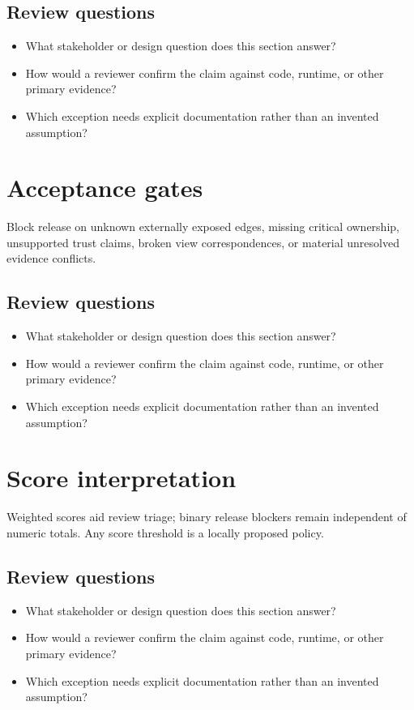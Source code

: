 \documentclass[10pt,letterpaper]{article}
\begin{document}
\subsection{Review questions}
\begin{itemize}
\item What stakeholder or design question does this section answer?
\item How would a reviewer confirm the claim against code, runtime, or other primary evidence?
\item Which exception needs explicit documentation rather than an invented assumption?
\end{itemize}

\section{Acceptance gates}
Block release on unknown externally exposed edges, missing critical ownership, unsupported trust claims, broken view correspondences, or material unresolved evidence conflicts.


\subsection{Review questions}
\begin{itemize}
\item What stakeholder or design question does this section answer?
\item How would a reviewer confirm the claim against code, runtime, or other primary evidence?
\item Which exception needs explicit documentation rather than an invented assumption?
\end{itemize}

\section{Score interpretation}
Weighted scores aid review triage; binary release blockers remain independent of numeric totals. Any score threshold is a locally proposed policy.


\subsection{Review questions}
\begin{itemize}
\item What stakeholder or design question does this section answer?
\item How would a reviewer confirm the claim against code, runtime, or other primary evidence?
\item Which exception needs explicit documentation rather than an invented assumption?
\end{itemize}
\end{document}
